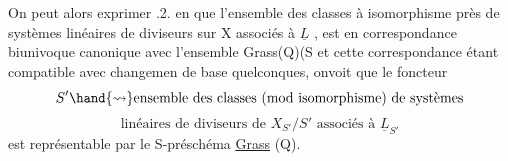 
On peut alors exprimer .2. en  que l'ensemble des classes
à isomorphisme près de systèmes linéaires de diviseurs sur X associés à
$\underline{L}$ , est en correspondance biunivoque canonique avec l'ensemble 
Grass(Q)(S et cette correspondance étant compatible avec  changemen
de base quelconques, onvoit que le foncteur
\[ S' \hand{\rightsquigarrow} \text{ensemble des classes (mod isomorphisme) de systèmes} \]
\[ \text{linéaires de diviseurs de } X_{S'}/S' \text{ associés à } \underline{L}_{S'} \]
est représentable par le S-préschéma \uline{Grass} (Q).

